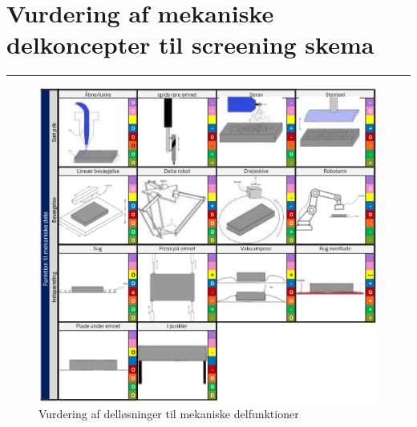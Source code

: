 \chapter{Vurdering af mekaniske delkoncepter til screening skema} \label{Bilag mekaniske delkonceptervurdering}

\plainbreak{-2}
\begin{figure}[H]
    \centering
     \includegraphics[width=.95\linewidth]{bilag/Media/Media/delkoncept mekanisk.png}
     \caption{Vurdering af delløsninger til mekaniske delfunktioner}
\end{figure}

